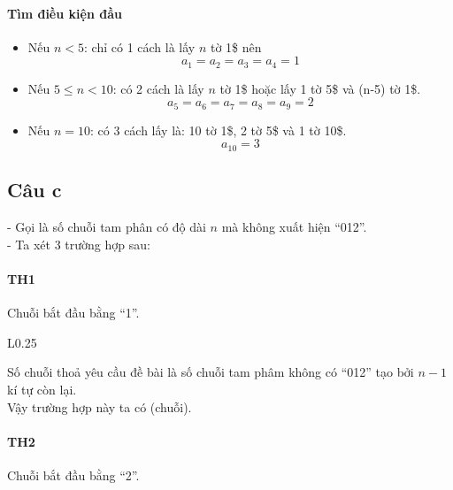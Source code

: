\documentclass[main.tex]{subfiles}
\begin{document}
\paragraph*{Tìm điều kiện đầu}
\hphantom{1pt}\par 
\begin{itemize}
    \item Nếu $n<5$: chỉ có 1 cách là lấy $n$ tờ 1\$ nên 
    $$
    a_1 = a_2 = a_3 = a_4 = 1
    $$
    \item Nếu $5\le n < 10$: có 2 cách là lấy $n$ tờ 1\$ hoặc lấy 1 tờ 5\$ và (n-5) tờ 1\$.
    $$
    a_5=a_6=a_7=a_8=a_9=2
    $$
    \item Nếu $n = 10$: có 3 cách lấy là: 10 tờ 1\$, 2 tờ 5\$ và 1 tờ 10\$.
    $$
    a_{10}=3
    $$
    
\end{itemize}

\subsection{Câu c}
- Gọi  là số chuỗi tam phân có độ dài $n$ mà không xuất hiện ``012''.\\
- Ta xét 3 trường hợp sau:

\paragraph{TH1} 
Chuỗi bắt đầu bằng ``1''.\\

\begin{wrapfigure}{L}{0.25\textwidth}
\end{wrapfigure}

Số chuỗi thoả yêu cầu đề bài là số chuỗi tam phâm không có ``012'' tạo bởi $n-1$ kí tự còn lại. \\
Vậy trường hợp này ta có  (chuỗi).\\

\paragraph{TH2} 
Chuỗi bắt đầu bằng ``2''.\\

\end{document}
